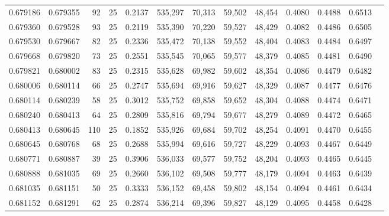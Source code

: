 \begin{tabular}{rrrrrrrrrrrrr}
0.679186 & 0.679355 &    92 &  25 &                                     0.2137 & 535,297 &  70,313 &  59,502 &  48,454 & 0.4080 & 0.4488 & 0.6513 \\
0.679360 & 0.679528 &    93 &  25 &                                     0.2119 & 535,390 &  70,220 &  59,527 &  48,429 & 0.4082 & 0.4486 & 0.6505 \\
0.679530 & 0.679667 &    82 &  25 &                                     0.2336 & 535,472 &  70,138 &  59,552 &  48,404 & 0.4083 & 0.4484 & 0.6497 \\
0.679668 & 0.679820 &    73 &  25 &                                     0.2551 & 535,545 &  70,065 &  59,577 &  48,379 & 0.4085 & 0.4481 & 0.6490 \\
0.679821 & 0.680002 &    83 &  25 &                                     0.2315 & 535,628 &  69,982 &  59,602 &  48,354 & 0.4086 & 0.4479 & 0.6482 \\
0.680006 & 0.680114 &    66 &  25 &                                     0.2747 & 535,694 &  69,916 &  59,627 &  48,329 & 0.4087 & 0.4477 & 0.6476 \\
0.680114 & 0.680239 &    58 &  25 &                                     0.3012 & 535,752 &  69,858 &  59,652 &  48,304 & 0.4088 & 0.4474 & 0.6471 \\
0.680240 & 0.680413 &    64 &  25 &                                     0.2809 & 535,816 &  69,794 &  59,677 &  48,279 & 0.4089 & 0.4472 & 0.6465 \\
0.680413 & 0.680645 &   110 &  25 &                                     0.1852 & 535,926 &  69,684 &  59,702 &  48,254 & 0.4091 & 0.4470 & 0.6455 \\
0.680645 & 0.680768 &    68 &  25 &                                     0.2688 & 535,994 &  69,616 &  59,727 &  48,229 & 0.4093 & 0.4467 & 0.6449 \\
0.680771 & 0.680887 &    39 &  25 &                                     0.3906 & 536,033 &  69,577 &  59,752 &  48,204 & 0.4093 & 0.4465 & 0.6445 \\
0.680888 & 0.681035 &    69 &  25 &                                     0.2660 & 536,102 &  69,508 &  59,777 &  48,179 & 0.4094 & 0.4463 & 0.6439 \\
0.681035 & 0.681151 &    50 &  25 &                                     0.3333 & 536,152 &  69,458 &  59,802 &  48,154 & 0.4094 & 0.4461 & 0.6434 \\
0.681152 & 0.681291 &    62 &  25 &                                     0.2874 & 536,214 &  69,396 &  59,827 &  48,129 & 0.4095 & 0.4458 & 0.6428 \\

\end{tabular}
